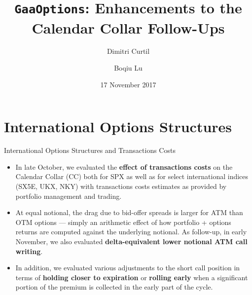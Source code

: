 \documentclass{beamer}
\title[{\tt GaaOptions}]{{\tt GaaOptions}: Enhancements to the Calendar Collar Follow-Ups}
\author[DC $|$ BL]{ Dimitri Curtil \and Boqiu Lu}
\date{17 November 2017}
\begin{document}
\begin{frame}
  \titlepage
\end{frame}

\section{International Options Structures}
\begin{frame}{International Options Structures and Transactions Costs}
\begin{itemize}

\item In late October, we evaluated the {\bf effect of transactions costs} on the Calendar Collar (CC) both for SPX as well as for select international indices (SX5E, UKX, NKY) with transactions costs estimates as provided by portfolio management and trading.
\vfill
\item At equal notional, the drag due to bid-offer spreads is larger for ATM than OTM options --- simply an arithmetic effect of how portfolio + options returns are computed against the underlying notional. As follow-up, in early November, we also evaluated {\bf delta-equivalent lower notional ATM call writing}.
\vfill
\item  In addition, we evaluated various adjustments to the short call position in terms of {\bf holding closer to expiration} or {\bf rolling early} when a significant portion of the premium is collected in the early part of the cycle.
\vfill

\end{itemize}
\end{frame}
\end{document}
